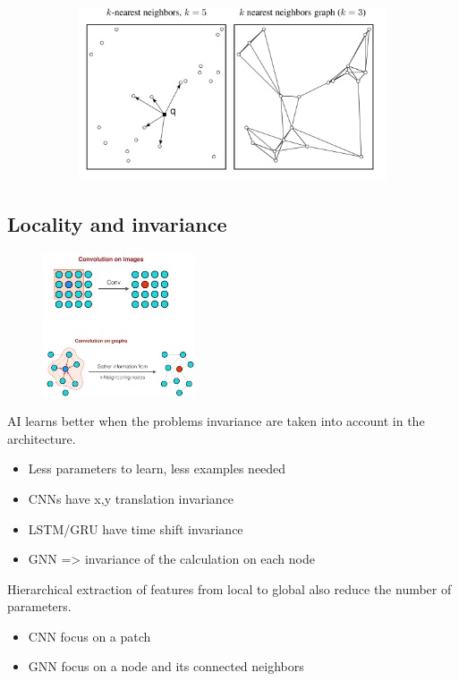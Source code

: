 \begin{figure}[ht]
\begin{subfigure}{.4\textwidth}
	\end{subfigure}%
	\begin{subfigure}{.6\textwidth}
		\centering
		\includegraphics[width=0.9\linewidth]{figure_ml/neighbors}
	\end{subfigure}%
\end{figure}


\subsection{Locality and invariance}

\begin{figure}
	\includegraphics[width=0.4\textwidth]{figure_ml/conv_img}
\end{figure} 

AI learns better when the problems
invariance are taken into account in the
architecture.
\begin{itemize}
	\item Less parameters to learn, less examples needed
	\item CNNs have x,y translation invariance
	\item LSTM/GRU have time shift invariance
	\item GNN => invariance of the calculation on each
	node
\end{itemize}

Hierarchical extraction of features from local
to global also reduce the number of parameters.
\begin{itemize}
	\item CNN focus on a patch
	\item GNN focus on a node and its connected neighbors
\end{itemize}


